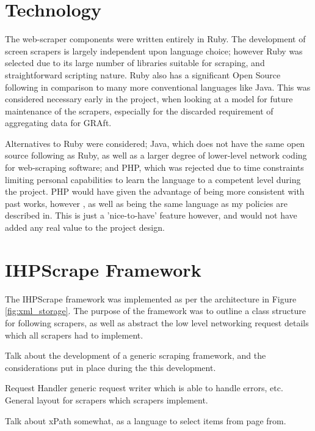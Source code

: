 \section{Technology}

The web-scraper components were written entirely in Ruby. The development of screen scrapers is largely independent upon language choice; however Ruby was selected due to its large number of libraries suitable for scraping, and straightforward scripting nature. Ruby also has a significant Open Source following in comparison to many more conventional languages like Java. This was considered necessary early in the project, when looking at a model for future maintenance of the scrapers, especially for the discarded requirement of aggregating data for GRAft. 

Alternatives to Ruby were considered; Java, which does not have the same open source following as Ruby, as well as a larger degree of lower-level network coding for web-scraping software; and PHP, which was rejected due to time constraints limiting personal capabilities to learn the language to a competent level during the project. PHP would have given the advantage of being more consistent with past works, however \cite{GRAft}, as well as being the same language as my policies are described in. This is just a 'nice-to-have' feature however, and would not have added any real value to the project design.

\section{IHPScrape Framework}

The IHPScrape framework was implemented as per the architecture in Figure \ref{fig:xml_storage}. The purpose of the framework was to outline a class structure for following scrapers, as well as abstract the low level networking request details which all scrapers had to implement. 

%

Talk about the development of a generic scraping framework, and the considerations put in place during the this development.

Request Handler generic request writer which is able to handle errors, etc. General layout for scrapers which scrapers implement.

Talk about xPath somewhat, as a language to select items from page from.



